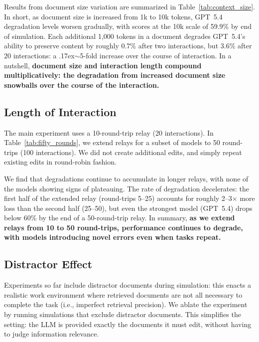 \documentclass{article} %
\begin{document}
Results from document size variation are summarized in Table~\ref{tab:context_size}. In short, as document size is increased from 1k to 10k tokens, GPT~5.4 degradation levels worsen gradually, with scores at the 10k scale of 59.9\% by end of simulation. Each additional 1,000 tokens in a document degrades GPT~5.4's ability to preserve content by roughly 0.7\% after two interactions, but 3.6\% after 20 interactions: a {\raise.17ex\hbox{$\scriptstyle\sim$}}5-fold increase over the course of interaction. In a nutshell, \textbf{document size and interaction length compound multiplicatively: the degradation from increased document size snowballs over the course of the interaction.}

\subsection{Length of Interaction} \label{sec:fifty_rounds}

The main experiment uses a 10-round-trip relay (20 interactions). In Table~\ref{tab:fifty_rounds}, we extend relays for a subset of models to 50 round-trips (100 interactions). We did not create additional edits, and simply repeat existing edits in round-robin fashion.

We find that degradations continue to accumulate in longer relays, with none of the models showing signs of plateauing. The rate of degradation decelerates: the first half of the extended relay (round-trips 5--25) accounts for roughly 2--3$\times$ more loss than the second half (25--50), but even the strongest model (GPT~5.4) drops below 60\% by the end of a 50-round-trip relay. In summary, \textbf{as we extend relays from 10 to 50 round-trips, performance continues to degrade, with models introducing novel errors even when tasks repeat.}

\subsection{Distractor Effect} \label{sec:distractor}


Experiments so far include distractor documents during simulation: this enacts a realistic work environment where retrieved documents are not all necessary to complete the task (i.e., imperfect retrieval precision). We ablate the experiment by running simulations that exclude distractor documents. This simplifies the setting: the LLM is provided exactly the documents it must edit, without having to judge information relevance.
\end{document}
